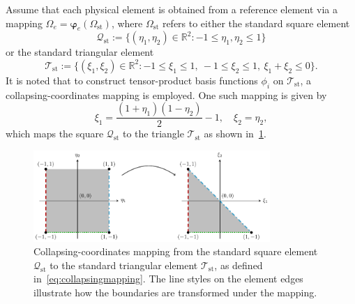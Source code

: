 \documentclass[../main.tex]{subfiles}
\begin{document}
Assume that each physical element is obtained from a reference element via a mapping $\Omega_e = \boldsymbol{\varphi}_e(\Omega_{\mathrm{st}})$, where $\Omega_{\mathrm{st}}$ refers to either the standard square element
\begin{equation}
	\mathcal{Q}_\text{st} := \{ (\eta_1, \eta_2) \in \mathbb{R}^2 : -1 \leq \eta_1, \eta_2 \leq 1 \}
\end{equation}
or the standard triangular element
\begin{equation}
	\mathcal{T}_\text{st} := \{ (\xi_1, \xi_2) \in \mathbb{R}^2 : -1 \leq \xi_1 \leq 1, \ -1 \leq \xi_2 \leq 1, \ \xi_1 + \xi_2 \leq 0 \}.
\end{equation}
It is noted that to construct tensor-product basis functions $\phi_i$ on $\mathcal{T}_\text{st}$, a collapsing-coordinates mapping is employed. One such mapping is given by
\begin{equation}
\xi_1 = \frac{(1+\eta_1)(1-\eta_2)}{2} - 1, 
\quad
\xi_2 = \eta_2,
\label{eq:collapsingmapping}
\end{equation}
which maps the square $\mathcal{Q}_\text{st}$ to the triangle $\mathcal{T}_\text{st}$ as shown in~\cref{fig:squareTriangle}. 

\begin{figure}[ht]
  \centering
	\includegraphics[width=0.8\textwidth]{../../Images/squareTriangle.pdf}
	\caption{Collapsing-coordinates mapping from the standard square element $\mathcal{Q}_\mathrm{st}$ to the standard triangular element $\mathcal{T}_\mathrm{st}$, as defined in~\eqref{eq:collapsingmapping}. The line styles on the element edges illustrate how the boundaries are transformed under the mapping.}
	\label{fig:squareTriangle}
\end{figure}
\end{document}
